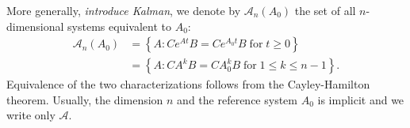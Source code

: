 \documentclass{article}
\newcommand{\plr}[1]{{\color{blue}\it #1}}
\newcommand{\calA}{\mathcal{A}}
\newcommand{\1}{\mathbbm{1}}
\begin{document}
  More generally, \plr{introduce Kalman},
  we denote by $\calA_n(A_0)$ the set of all $n$-dimensional systems equivalent to $A_0$:
  \begin{equation} \label{eqn:equivalence}
      \begin{aligned}
      \calA_n(A_0) 
          &= \left\{
              A : C e^{At} B = C e^{A_0 t} B \; \text{for}\; t \ge 0 
          \right\}  \\
          &= \left\{
              A : C A^k B = C A_0^k B \; \text{for}\; 1 \le k \le n-1 
          \right\} .
      \end{aligned}
  \end{equation}
  Equivalence of the two characterizations follows from the Cayley-Hamilton theorem.
  Usually, the dimension $n$ and the reference system $A_0$ is implicit and we write only $\calA$.
\end{document}
